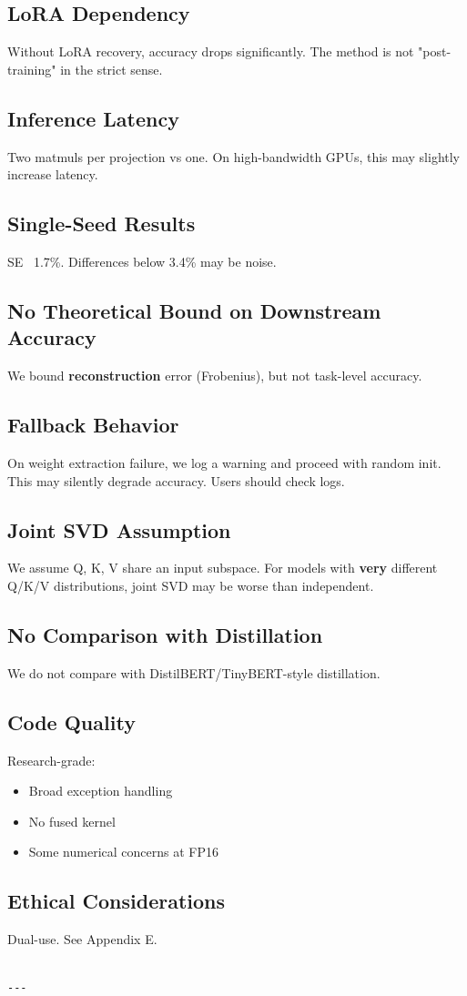 \subsection{LoRA Dependency}

Without LoRA recovery, accuracy drops significantly. The method is not 
"post-training" in the strict sense.

\subsection{Inference Latency}

Two matmuls per projection vs one. On high-bandwidth GPUs, this may 
slightly increase latency.

\subsection{Single-Seed Results}

SE ~1.7\%. Differences below 3.4\% may be noise.

\subsection{No Theoretical Bound on Downstream Accuracy}

We bound \textbf{reconstruction} error (Frobenius), but not task-level accuracy.

\subsection{Fallback Behavior}

On weight extraction failure, we log a warning and proceed with random init. 
This may silently degrade accuracy. Users should check logs.

\subsection{Joint SVD Assumption}

We assume Q, K, V share an input subspace. For models with \textbf{very} different 
Q/K/V distributions, joint SVD may be worse than independent.

\subsection{No Comparison with Distillation}

We do not compare with DistilBERT/TinyBERT-style distillation.

\subsection{Code Quality}

Research-grade:
\begin{itemize}
\item Broad exception handling
\item No fused kernel
\item Some numerical concerns at FP16

\end{itemize}
\subsection{Ethical Considerations}

Dual-use. See Appendix E.
\begin{lstlisting}

---
\end{lstlisting}